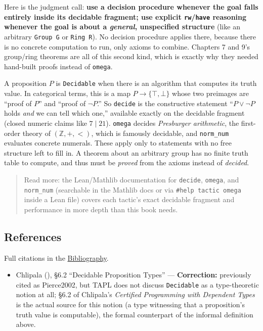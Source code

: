 Here is the judgment call: \textbf{use a decision procedure whenever the goal falls entirely inside its decidable fragment; use explicit \texttt{rw}/\texttt{have} reasoning whenever the goal is about a \emph{general}, unspecified structure} (like an arbitrary \texttt{Group G} or \texttt{Ring R}). No decision procedure applies there, because there is no concrete computation to run, only axioms to combine. Chapters 7 and 9's group/ring theorems are all of this second kind, which is exactly why they needed hand-built proofs instead of \texttt{omega}.

\begin{mathreading}

A proposition \(P\) is \texttt{Decidable} when there is an algorithm that computes its truth value. In categorical terms, this is a map \(P \to \{\top, \bot\}\) whose two preimages are ``proof of \(P\)'' and ``proof of \(\neg P\).'' So \texttt{decide} is the constructive statement ``\(P \vee
\neg P\) holds \emph{and} we can tell which one,'' available exactly on the decidable fragment (closed numeric claims like \(7 \mid 21\)). \texttt{omega} decides \emph{Presburger arithmetic}, the first-order theory of \((\mathbb{Z},
+, <)\), which is famously decidable, and \texttt{norm\_\allowbreak{}num} evaluates concrete numerals. These apply only to statements with no free structure left to fill in. A theorem about an arbitrary group has no finite truth table to compute, and thus must be \emph{proved} from the axioms instead of \emph{decided}.

\end{mathreading}

\begin{quote}
Read more: the Lean/Mathlib documentation for \texttt{decide}, \texttt{omega}, and \texttt{norm\_\allowbreak{}num} (searchable in the Mathlib docs or via \texttt{\#help tactic omega} inside a Lean file) covers each tactic's exact decidable fragment and performance in more depth than this book needs.
\end{quote}

\subsection{References}\label{sec:12-working-efficiently:02-decision-procedures:2}

Full citations in the \hyperref[sec:root:bibliography:1]{Bibliography}.

\begin{itemize}
\tightlist
\item
  Chlipala (\cite{Chlipala2013}), §6.2 ``Decidable Proposition Types'' --- \textbf{Correction:} previously cited as Pierce2002, but TAPL does not discuss \texttt{Decidable} as a type-theoretic notion at all; §6.2 of Chlipala's \emph{Certified Programming with Dependent Types} is the actual source for this notion (a type witnessing that a proposition's truth value is computable), the formal counterpart of the informal definition above.
\end{itemize}
